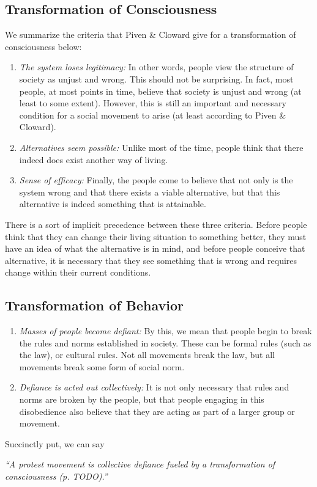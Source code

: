 \subsection{Transformation of Consciousness}
We summarize the criteria that Piven \& Cloward give for a transformation of consciousness below:
\begin{enumerate}
    \item \textit{The system loses legitimacy:}
    In other words, people view the structure of society as unjust and wrong.
    This should not be surprising.
    In fact, most people, at most points in time, believe that society is unjust and wrong (at least to some extent).
    However, this is still an important and necessary condition for a social movement to arise (at least according to Piven \& Cloward).
    \item \textit{Alternatives seem possible:}
    Unlike most of the time, people think that there indeed does exist another way of living.
    \item \textit{Sense of efficacy:}
    Finally, the people come to believe that not only is the system wrong and that there exists a viable alternative, but that this alternative is indeed something that is attainable.
\end{enumerate}
There is a sort of implicit precedence between these three criteria.
Before people think that they can change their living situation to something better, they must have an idea of what the alternative is in mind, and before people conceive that alternative, it is necessary that they see something that is wrong and requires change within their current conditions.

\subsection{Transformation of Behavior}

\begin{enumerate}
    \item \textit{Masses of people become defiant:}
    By this, we mean that people begin to break the rules and norms established in society.
    These can be formal rules (such as the law), or cultural rules.
    Not all movements break the law, but all movements break some form of social norm.
    \item \textit{Defiance is acted out collectively:}
    It is not only necessary that rules and norms are broken by the people, but that people engaging in this disobedience also believe that they are acting as part of a larger group or movement.
\end{enumerate}
Succinctly put, we can say 
\begin{center}
\textit{``A protest movement is collective defiance fueled by a transformation of consciousness (p. TODO).''}  
\end{center}


